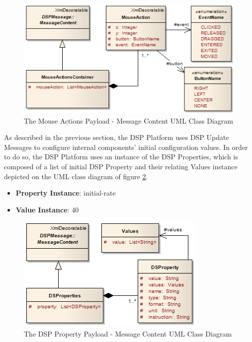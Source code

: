 \begin{figure}[!h]
  \centering
  \includegraphics[scale=0.5]{../diagrams/Mouse-Actions--MessageContainer-Class-Diagram}
  \caption{The Mouse Actions Payload - Message Content UML Class Diagram}
  \label{fig:Mouse-Actions--MessageContainer-Class-Diagram}
\end{figure}

As described in the previous section, the DSP Platform uses DSP Update
Messages to configure internal components' initial configuration values. In
order to do so, the DSP Platform uses an instance of the DSP Properties, which
is composed of a list of initial DSP Property and their relating Values
instance depicted on the UML class diagram \cite{uml} of figure
\ref{fig:DSP-Property-Class-Diagram}. 

\begin{itemize}
  \item \textbf{Property Instance}: initial-rate
  \item \textbf{Value Instance}: 40
\end{itemize}

\begin{figure}[!t]
  \centering
  \includegraphics[scale=0.6]{../diagrams/DSP-Property-Class-Diagram}
  \caption{The DSP Property Payload - Message Content UML Class Diagram}
  \label{fig:DSP-Property-Class-Diagram}
\end{figure}

